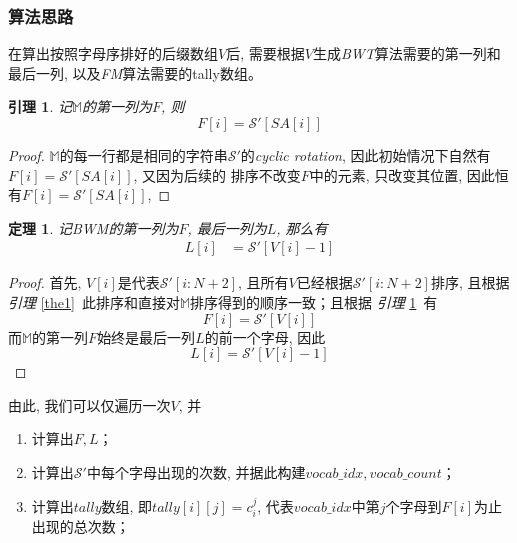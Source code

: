 \documentclass[UTF8]{ctexart}
\newcommand{\refl}[1]{\emph{引理} \ref{#1}\ }
\newtheorem{theory}{定理}
\newtheorem{lemma}{引理}
\begin{document}
    \subsubsection{算法思路}
    在算出按照字母序排好的后缀数组$V$后, 需要根据$V$生成\emph{BWT}算法需要的第一列和最后一列, 以及\emph{FM}算法需要的tally数组。
    \begin{lemma}
        \label{lem1}
        记$\mathbb{M}$的第一列为$F$, 则
        \begin{equation}
            F[i] = \mathcal{S}'[SA[i]]
        \end{equation}
    \end{lemma}
    \begin{proof}
        $\mathbb{M}$的每一行都是相同的字符串$\mathcal{S}'$的\emph{cyclic rotation}, 因此初始情况下自然有$F[i] = \mathcal{S}'[SA[i]]$, 又因为后续的
        排序不改变$F$中的元素, 只改变其位置, 因此恒有$F[i] = \mathcal{S}'[SA[i]]$, 
    \end{proof}

    \begin{theory}
        记BWM的第一列为$F$, 最后一列为$L$, 那么有\begin{align}
            L[i]& = \mathcal{S'}[V[i] - 1]
        \end{align}
    \end{theory}
    \begin{proof}
        首先, $V[i]$是代表$\mathcal{S}'[i:N+2]$, 且所有$V$已经根据$\mathcal{S}'[i:N+2]$排序, 
        且根据\refl{the1}此排序和直接对$\mathbb{M}$排序得到的顺序一致；且根据
        \refl{lem1}有\begin{equation*}
            F[i] = \mathcal{S}'[V[i]]
        \end{equation*}
        而$\mathbb{M}$的第一列$F$始终是最后一列$L$的前一个字母, 因此\begin{equation}
            L[i] = \mathcal{S'}[V[i] - 1]
        \end{equation}
        
    \end{proof}
    \noindent 由此, 我们可以仅遍历一次$V$, 并\begin{enumerate}
        \item 计算出$F,L$；
        \item 计算出$\mathcal{S}'$中每个字母出现的次数, 并据此构建$vocab\_idx,vocab\_count$；
        \item 计算出$tally$数组, 即$tally[i][j] = c_i^j$, 代表$vocab\_idx$中第$j$个字母到$F[i]$为止出现的总次数；
    \end{enumerate}
\end{document}
